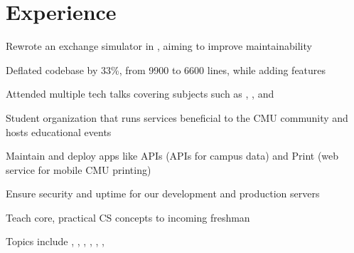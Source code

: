 \documentclass[]{deedy-resume-openfont}
\begin{document}
\begin{minipage}[t]{0.66\textwidth} 


\section{Experience}

\vspace{\topsep} %
\begin{tightemize}
\item Rewrote an exchange simulator in , aiming to improve maintainability
\item Deflated codebase by 33\%, from 9900 to 6600 lines, while adding features
\item Attended multiple tech talks covering subjects such as , , and 
\end{tightemize}
\sectionsep

\begin{tightemize}
\item Student organization that runs services beneficial to the CMU community and hosts educational events
\item Maintain and deploy apps like APIs (APIs for campus data) and Print (web service for mobile CMU printing)
\item Ensure security and uptime for our development and production servers
\end{tightemize}
\sectionsep

\begin{tightemize}
\item Teach core, practical CS concepts to incoming freshman
\item Topics include , , , , , , 
\end{tightemize}
\sectionsep



\end{minipage}
\end{document}
